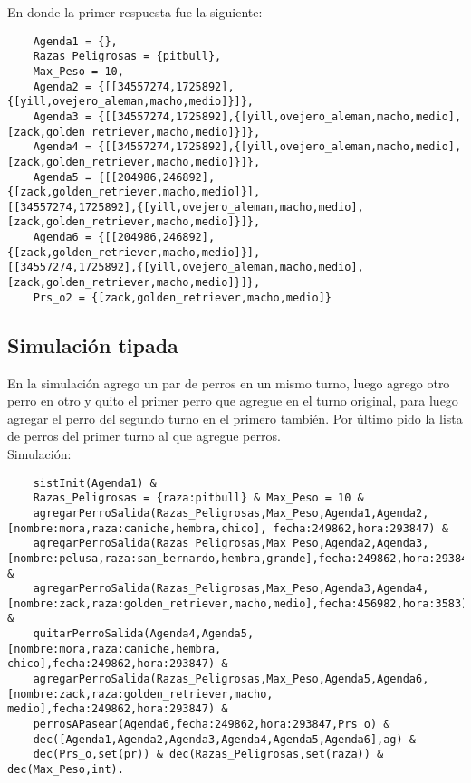 \documentclass[12pt,zed]{article}
\begin{document}
En donde la primer respuesta fue la siguiente:
\begin{verbatim}
    Agenda1 = {},  
    Razas_Peligrosas = {pitbull},  
    Max_Peso = 10,  
    Agenda2 = {[[34557274,1725892],{[yill,ovejero_aleman,macho,medio]}]},  
    Agenda3 = {[[34557274,1725892],{[yill,ovejero_aleman,macho,medio],
[zack,golden_retriever,macho,medio]}]},  
    Agenda4 = {[[34557274,1725892],{[yill,ovejero_aleman,macho,medio],
[zack,golden_retriever,macho,medio]}]},  
    Agenda5 = {[[204986,246892],{[zack,golden_retriever,macho,medio]}],
[[34557274,1725892],{[yill,ovejero_aleman,macho,medio],
[zack,golden_retriever,macho,medio]}]},  
    Agenda6 = {[[204986,246892],{[zack,golden_retriever,macho,medio]}],
[[34557274,1725892],{[yill,ovejero_aleman,macho,medio],
[zack,golden_retriever,macho,medio]}]},  
    Prs_o2 = {[zack,golden_retriever,macho,medio]}
\end{verbatim}

\subsection*{Simulación tipada}

En la simulación agrego un par de perros en un mismo turno, luego agrego otro perro en otro y quito el primer perro que agregue en el turno original, para luego agregar el perro del segundo turno en el primero también. Por último pido la lista de perros del primer turno al que agregue perros. \\

Simulación:

\begin{verbatim}
    sistInit(Agenda1) &
    Razas_Peligrosas = {raza:pitbull} & Max_Peso = 10 &
    agregarPerroSalida(Razas_Peligrosas,Max_Peso,Agenda1,Agenda2,
[nombre:mora,raza:caniche,hembra,chico], fecha:249862,hora:293847) &
    agregarPerroSalida(Razas_Peligrosas,Max_Peso,Agenda2,Agenda3,
[nombre:pelusa,raza:san_bernardo,hembra,grande],fecha:249862,hora:293847) &
    agregarPerroSalida(Razas_Peligrosas,Max_Peso,Agenda3,Agenda4,
[nombre:zack,raza:golden_retriever,macho,medio],fecha:456982,hora:3583) &
    quitarPerroSalida(Agenda4,Agenda5,[nombre:mora,raza:caniche,hembra,
chico],fecha:249862,hora:293847) &
    agregarPerroSalida(Razas_Peligrosas,Max_Peso,Agenda5,Agenda6,
[nombre:zack,raza:golden_retriever,macho, medio],fecha:249862,hora:293847) &
    perrosAPasear(Agenda6,fecha:249862,hora:293847,Prs_o) &
    dec([Agenda1,Agenda2,Agenda3,Agenda4,Agenda5,Agenda6],ag) &
    dec(Prs_o,set(pr)) & dec(Razas_Peligrosas,set(raza)) & dec(Max_Peso,int).
\end{verbatim}
\end{document}
